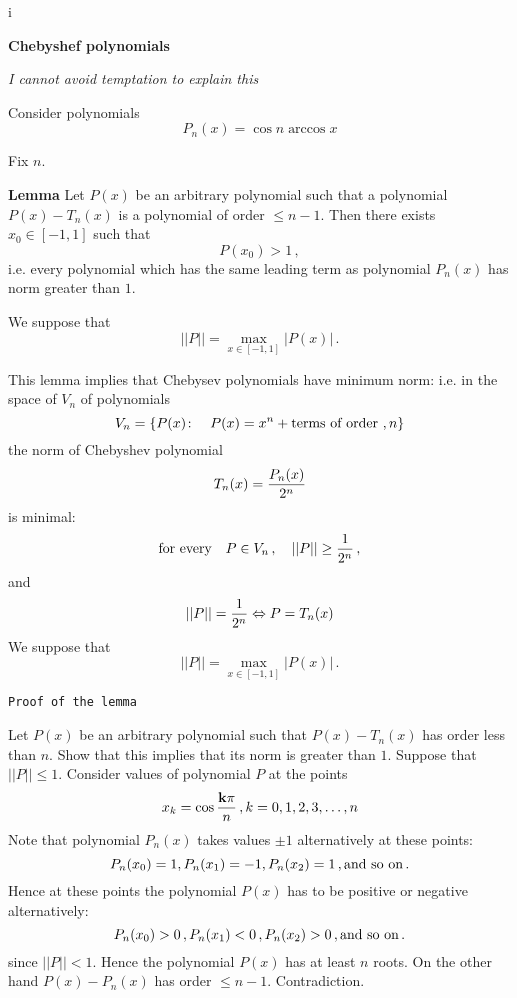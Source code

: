 i



\baselineskip=14pt
\def\vare {\varepsilon}
\def\A {{\bf A}}
\def\t {\tilde}
\def\a {\alpha}
\def\K {{\bf K}}
\def\N {{\bf N}}
\def\w {\omega}
\def\s {{\sigma}}
\def\S {{\Sigma}}
\def\s {{\sigma}}
\def\p{\partial}
\def\vare{{\varepsilon}}
\def\Q {{\bf Q}}
\def\D {{\cal D}}
\def\G {{\Gamma}}
\def\C {{\bf C}}
\def\L {{\cal L}}
\def\Z {{\bf Z}}
\def\U  {{\cal U}}
\def\H {{\cal H}}
\def\R  {{\bf R}}
\def\S  {{\bf S}}
\def\E  {{\bf E}}
\def\l {\lambda}
\def\M {{\cal M}}
\def\degree {{\bf {\rm degree}\,\,}}
\def \finish {${\,\,\vrule height1mm depth2mm width 8pt}$}
\def \m {\medskip}
\def\p {\partial}
\def\r {{\bf r}}
\def\pt {{\bf pt}}
\def\v {{\bf v}}
\def\n {{\bf n}}
\def\t {{\bf t}}
\def\b {{\bf b}}
\def\c {{\bf c }}
\def\e{{\bf e}}
\def\k{{\bf k}}
\def\l{{\bf l}}
\def\ac {{\bf a}}
\def \X   {{\bf X}}
\def \Y   {{\bf Y}}
\def \x   {{\bf x}}
\def \y   {{\bf y}}
\def \G{{\cal G}}
\def\ss  {\sigma_{\rm sph}}
\def\grad {{\rm grad\,}}

\centerline {\bf Chebyshef polynomials}

{\it I cannot avoid temptation to explain this}


Consider polynomials
     $$
   P_n(x)=\cos n\arccos x 
     $$

Fix  $n$.

{\bf Lemma}
Let $P(x)$ be an arbitrary polynomial such that
       a polynomial $P(x)-T_n(x)$ is a polynomial
of order $\leq n-1$.  Then there exists $x_0\in [-1,1]$
such that
        $$
    P(x_0)>1\,,
        $$
i.e.
 every polynomial which has the same leading term as polynomial
 $P_n(x)$ has norm greater than $1$.
  
  We suppose that
        $$
   ||P||=\max_{x\in [-1,1]}|P(x)|\,.
      $$


This lemma implies that Chebysev polynomials have minimum norm:
 i.e. in the space of $V_n$ of polynomials
            $$
      V_n=\{P(x)\colon\quad P(x)=x^n+\hbox {terms of order $,n$}\}
            $$
the norm of Chebyshev polynomial        
           $$
     T_n(x)={P_n(x)\over 2^n}
            $$
is minimal:
             $$
\hbox{for every}\quad
 P\in V_n\,,\quad  ||P||\geq {1\over 2^n}\,,
             $$
and
         $$
  ||P||={1\over 2^n}\Leftrightarrow P=T_n(x)
        $$
We suppose that
       $$
   ||P||=\max_{x\in [-1,1]}|P(x)|\,.
      $$

{\tt Proof of the lemma}

Let $P(x)$ be an arbitrary polynomial such that
$P(x)-T_n(x)$ has order less than $n$. Show that this implies
that its norm is greater than $1$.  Suppose that
  $||P||\leq 1$. Consider values of polynomial $P$ at the points
       $$
   x_k=\cos{\k\pi\over n}\,, k=0,1,2,3,\dots,n
       $$
Note that polynomial  $P_n(x)$  takes values $\pm 1$
alternatively at these points:
         $$
P_n(x_0)=1, P_n(x_1)=-1,
P_n(x_2)=1\,, \hbox{and so on}\,. 
         $$
Hence
at these points the polynomial $P(x)$
has to be positive or negative alternatively:
        $$
P_n(x_0)>0\,, P_n(x_1)<0\,,
P_n(x_2)>0\,, \hbox{and so on}\,. 
         $$
since $||P||<1$. Hence 
the polynomial $P(x)$ has at least $n$ roots.
On the other hand $P(x)-P_n(x)$ has order $\leq n-1$.
Contradiction.
\bye
